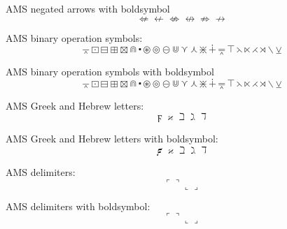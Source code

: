 \documentclass[12pt,a4paper]{article}
\theoremstyle{clearprint}
\begin{document}
\noindent
AMS negated arrows with boldsymbol
\begin{equation}
\boldsymbol{\nLeftarrow \nleftarrow \nLeftrightarrow \nleftrightarrow \nRightarrow \nrightarrow}
\end{equation}

\noindent
AMS binary operation symbols: %
\begin{equation}
\barwedge \boxdot \boxminus \boxplus \boxtimes \Cap \centerdot \circledast \circledcirc \circleddash \Cup \curlyvee \curlywedge \divideontimes \dotplus \doublebarwedge \intercal \leftthreetimes \ltimes \rightthreetimes \rtimes \smallsetminus \veebar 
\end{equation}

\noindent
AMS binary operation symbols with boldsymbol
\begin{equation}
\boldsymbol{\barwedge \boxdot \boxminus \boxplus \boxtimes \Cap \centerdot \circledast \circledcirc \circleddash \Cup \curlyvee \curlywedge \divideontimes \dotplus \doublebarwedge \intercal \leftthreetimes \ltimes \rightthreetimes \rtimes \smallsetminus \veebar}
\end{equation}

\noindent
AMS Greek and Hebrew letters: %
\begin{equation}
\digamma \varkappa \beth \gimel \daleth 
\end{equation}

\noindent
AMS Greek and Hebrew letters with boldsymbol:
\begin{equation}
\boldsymbol{\digamma \varkappa \beth \gimel \daleth} 
\end{equation}

\noindent
AMS delimiters: %
\begin{equation}
\ulcorner \urcorner \llcorner \lrcorner
\end{equation}

\noindent
AMS delimiters with boldsymbol:
\begin{equation}
\boldsymbol{\ulcorner \urcorner \llcorner \lrcorner}
\end{equation}
\end{document}
